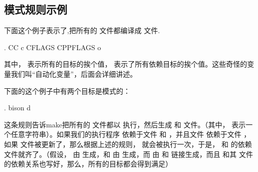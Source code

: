 \documentclass[a4paper,10pt]{sphinxmanual}
\begin{document}
\subsection{模式规则示例}
\label{\detokenize{implicit_rules:id10}}
下面这个例子表示了,把所有的  文件都编译成  文件.

\begin{sphinxVerbatim}[commandchars=\\\{\}]
 \PYGZpc{}.
    CC \PYGZhy{}c CFLAGS CPPFLAGS \PYGZdl{}\PYGZlt{} \PYGZhy{}o 
\end{sphinxVerbatim}

其中，  表示所有的目标的挨个值， \sphinxcode{\sphinxupquote{\$\textless{}}} 表示了所有依赖目标的挨个值。这些奇怪的变量我们叫“自动化变量”，后面会详细讲述。

下面的这个例子中有两个目标是模式的：

\begin{sphinxVerbatim}[commandchars=\\\{\}]
 \PYGZpc{}.
    bison \PYGZhy{}d \PYGZdl{}\PYGZlt{}
\end{sphinxVerbatim}

这条规则告诉make把所有的  文件都以  执行，然后生成 
和  文件。（其中，  表示一个任意字符串）。如果我们的执行程序 
依赖于文件  和  ，并且文件  依赖于文件  ，如果  文件被更新了，那么根据上述的规则，  就会被执行一次，于是，  和  的依赖文件就齐了。（假设，  由
 生成，和  由  生成，而  由 
和  链接生成，而且  和其  文件的依赖关系也写好，那么，所有的目标都会得到满足）
\end{document}
